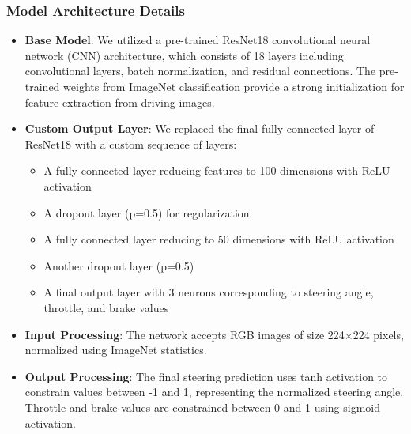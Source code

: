 \documentclass[pdflatex,sn-mathphys-num]{sn-jnl}%
\theoremstyle{thmstyleone}%
\theoremstyle{thmstyletwo}%
\theoremstyle{thmstylethree}%
\begin{document}
\subsubsection{Model Architecture Details}
\begin{itemize}
\item \textbf{Base Model}: We utilized a pre-trained ResNet18 convolutional neural network (CNN) architecture, which consists of 18 layers including convolutional layers, batch normalization, and residual connections. The pre-trained weights from ImageNet classification provide a strong initialization for feature extraction from driving images.

\item \textbf{Custom Output Layer}: We replaced the final fully connected layer of ResNet18 with a custom sequence of layers:
  \begin{itemize}
  \item A fully connected layer reducing features to 100 dimensions with ReLU activation
  \item A dropout layer (p=0.5) for regularization
  \item A fully connected layer reducing to 50 dimensions with ReLU activation
  \item Another dropout layer (p=0.5)
  \item A final output layer with 3 neurons corresponding to steering angle, throttle, and brake values
  \end{itemize}

\item \textbf{Input Processing}: The network accepts RGB images of size 224×224 pixels, normalized using ImageNet statistics.

\item \textbf{Output Processing}: The final steering prediction uses tanh activation to constrain values between -1 and 1, representing the normalized steering angle. Throttle and brake values are constrained between 0 and 1 using sigmoid activation.
\end{itemize}
\end{document}
